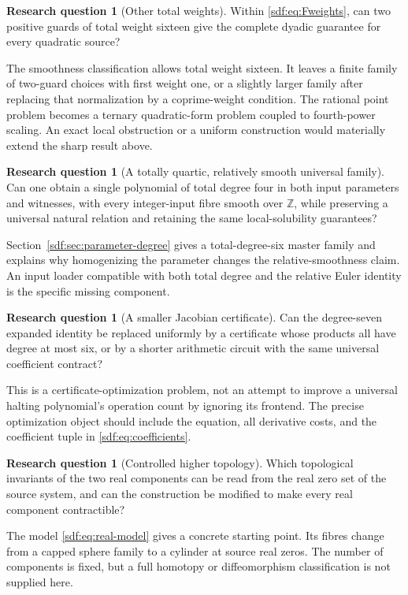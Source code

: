 \documentclass[11pt,a4paper]{article}
\theoremstyle{definition}
\newtheorem{question}[theorem]{Research question}
\theoremstyle{remark}
\newcommand{\Z}{\mathbb Z}
\begin{document}
\begin{question}[Other total weights]\label{sdf:q:weights}
Within \eqref{sdf:eq:Fweights}, can two positive guards of total weight sixteen
give the complete dyadic guarantee for every quadratic source?
\end{question}
The smoothness classification allows total weight sixteen. It leaves a
finite family of two-guard choices with first weight one, or a slightly
larger family after replacing that normalization by a coprime-weight
condition. The rational point problem becomes a ternary quadratic-form
problem coupled to fourth-power scaling. An exact local obstruction or a
uniform construction would materially extend the sharp result above.

\begin{question}[A totally quartic, relatively smooth universal family]\label{sdf:q:totalquartic}
Can one obtain a single polynomial of total degree four in both input
parameters and witnesses, with every integer-input fibre smooth over $\Z$,
while preserving a universal natural relation and retaining the same
local-solubility guarantees?
\end{question}
Section~\ref{sdf:sec:parameter-degree} gives a total-degree-six master family
and explains why homogenizing the parameter changes the relative-smoothness
claim. An input loader compatible with both total degree and the relative
Euler identity is the specific missing component.

\begin{question}[A smaller Jacobian certificate]\label{sdf:q:jacobian}
Can the degree-seven expanded identity be replaced uniformly by a
certificate whose products all have degree at most six, or by a shorter
arithmetic circuit with the same universal coefficient contract?
\end{question}
This is a certificate-optimization problem, not an attempt to improve a
universal halting polynomial's operation count by ignoring its frontend.
The precise optimization object should include the equation, all derivative
costs, and the coefficient tuple in \eqref{sdf:eq:coefficients}.

\begin{question}[Controlled higher topology]\label{sdf:q:topology}
Which topological invariants of the two real components can be read from
the real zero set of the source system, and can the construction be modified
to make every real component contractible?
\end{question}
The model \eqref{sdf:eq:real-model} gives a concrete starting point. Its fibres
change from a capped sphere family to a cylinder at source real zeros.
The number of components is fixed, but a full homotopy or diffeomorphism
classification is not supplied here.
\end{document}
